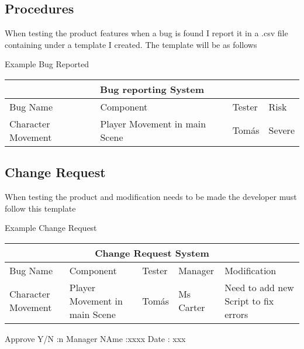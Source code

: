 \subsection{Procedures}


When testing the product features when a bug is found I report it in a  .csv file containing under a template I created. The template will be as follows\\



\centerline{Example Bug Reported}
\centerline{}

\setlength{\arrayrulewidth}{1mm}
\setlength{\tabcolsep}{18pt}
\renewcommand{\arraystretch}{2.5}

\begin{tabular}{ |p{2.5cm}|p{2.5cm}|p{2.5cm}||p{2.5cm}|  }
\hline
\multicolumn{4}{|c|}{Bug reporting System } \\
\hline
Bug Name      & Component  & Tester & Risk \\
\hline
Character Movement   & Player Movement in main Scene & Tomás & Severe \\
\hline

\end{tabular}



\subsection{Change Request}


When testing the product and modification needs to be made the developer must follow this template



\centerline{Example Change Request}
\centerline{}

\setlength{\arrayrulewidth}{1mm}
\setlength{\tabcolsep}{18pt}
\renewcommand{\arraystretch}{1.5}

\begin{tabular}{ |p{1.5cm}|p{1.5cm}|p{1.5cm}||p{1.5cm}|p{1.5cm}|  }
\hline
\multicolumn{5}{|c|}{Change Request System } \\
\hline
Bug Name      & Component  & Tester & Manager & Modification \\
\hline
Character Movement   & Player Movement in main Scene & Tomás & Ms Carter & Need to add new Script to fix errors \\
\hline

\end{tabular}

\centerline{
}

\centerline{Approve Y/N :n Manager NAme :xxxx   Date : xxx
}


